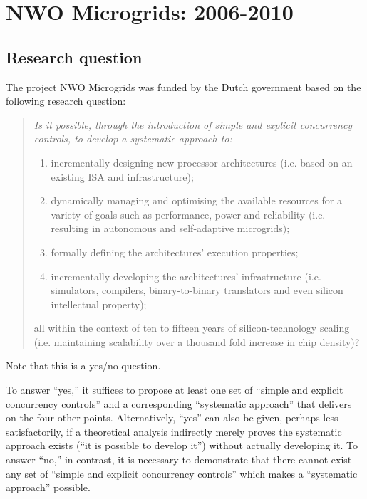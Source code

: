 \section{NWO Microgrids: 2006-2010}

\subsection{Research question}

The project NWO Microgrids was funded by the Dutch government based on
the following research question:

\begin{quote} \itshape
Is it possible, through the introduction of simple and explicit concurrency controls, to develop a systematic approach to:
\begin{enumerate}
\item incrementally designing new processor architectures (i.e. based on an existing ISA and infrastructure);
\item dynamically managing and optimising the available resources for a variety of goals such as performance, power and reliability (i.e. resulting in autonomous and self-adaptive microgrids);
\item formally defining the architectures' execution properties; 
\item incrementally developing the architectures' infrastructure (i.e. simulators, compilers, binary-to-binary translators and even silicon intellectual property); 
\end{enumerate}
all within the context of ten to fifteen years of silicon-technology scaling (i.e. maintaining scalability over a thousand fold increase in chip density)?
\end{quote}

Note that this is a yes/no question. 

To answer ``yes,'' it suffices to propose at least one set of ``simple
and explicit concurrency controls'' and a corresponding ``systematic
approach'' that delivers on the four other points. Alternatively,
``yes'' can also be given, perhaps less satisfactorily, if a
theoretical analysis indirectly merely proves the systematic approach 
exists (``it is possible to develop it'') without actually developing
it.  To answer ``no,'' in contrast, it is necessary to demonstrate
that there cannot exist any set of ``simple and explicit concurrency
controls'' which makes a ``systematic approach'' possible.


